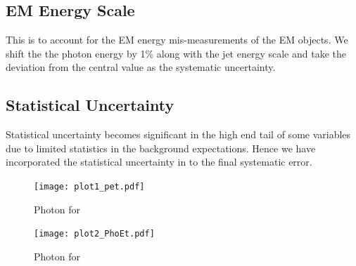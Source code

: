 \documentclass[11pt]{article}
\begin{document}
\subsection{EM Energy Scale}
This is to account for the EM energy mis-measurements of the EM objects. We shift the the photon energy by 1\% along with the jet energy scale and take the deviation from the central value as the systematic uncertainty.

\subsection{Statistical Uncertainty}
Statistical uncertainty becomes significant in the high end tail of some variables due to limited statistics in the background expectations. Hence we have incorporated the statistical uncertainty in to the final systematic error.


\begin{figure}
\begin{centering}
 {
\texttt{[image: plot1\_pet.pdf]} }
\caption{Photon \et for \phoonejet}
\label{fig-p1j_pet}
\end{centering}
\end{figure}

\begin{figure}
\begin{centering}
 {
\texttt{[image: plot2\_PhoEt.pdf]} }
\caption{Photon \et for \photwojet}
\label{fig-p2j_pet}
\end{centering}
\end{figure}
\end{document}
